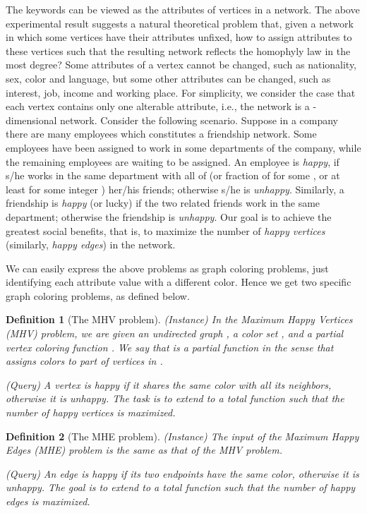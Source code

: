 \documentclass[11pt]{article}
\newtheorem{definition}{Definition}[section]
\begin{document}
The keywords can be viewed as the attributes of vertices in a network.
The above experimental result suggests a natural theoretical problem that,
given a network in which some vertices have their attributes unfixed,
how to assign attributes to these vertices such that the resulting
network reflects the homophyly law in the most degree?
Some attributes of a vertex cannot be changed, such as nationality, sex,
color and language, but some other attributes can be changed,
such as interest, job, income and working place.
For simplicity, we consider the case that each vertex contains only one
alterable attribute, i.e., the network is a -dimensional network.
Consider the following scenario. Suppose in a company there are many employees
which constitutes a friendship network.
Some employees have been assigned to work in some departments of the
company, while the remaining employees are waiting to be assigned.
An employee is {\em happy}, if s/he works in the same department with all of
(or  fraction of for some , or at least  for some
integer ) her/his friends; otherwise s/he is {\em unhappy}.
Similarly, a friendship is {\em happy} (or lucky) if the two
related friends work in the same department; otherwise the friendship is
{\em unhappy}. Our goal is to achieve the greatest social benefits, that is,
to maximize the number of {\em happy vertices} (similarly, {\em happy edges})
in the network.



We can easily express the above problems as graph coloring problems,
just identifying each attribute value with a different color.
Hence we get two specific graph coloring problems, as defined below.


\begin{definition}[The MHV problem]
(Instance) In the Maximum Happy Vertices (MHV) problem, we are given
an undirected graph , a color set ,
and a partial vertex coloring function . We say that 
is a partial function in the sense that  assigns colors to part of
vertices in .

(Query) A vertex is {\em happy} if it shares the same color with all its
neighbors, otherwise it is {\em unhappy}. The task is to extend  to a total
function  such that the number of happy vertices is maximized.
\end{definition}

\begin{definition}[The MHE problem]
(Instance) The input of the Maximum Happy Edges (MHE) problem is the same
as that of the MHV problem.

(Query) An edge is {\em happy} if its two endpoints have the same color,
otherwise it is {\em unhappy}. The goal is to extend  to a total function 
such that the number of happy edges is maximized.
\end{definition}
\end{document}
